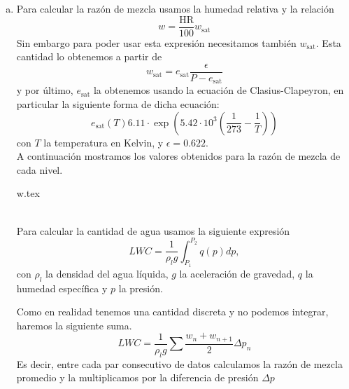 \documentclass[../main.tex]{subfiles}
\begin{document}
\begin{enumerate}[a)]
    \item Para calcular la razón de mezcla usamos la humedad relativa y la relación
        \begin{equation}
            w = \frac{\text{HR}}{100} w_\text{sat}  
        \end{equation}
Sin embargo para poder usar esta expresión necesitamos también $w_\text{sat}$. Esta cantidad lo obtenemos a partir de
\begin{equation}
    w_\text{sat} = e_\text{sat} \frac{\epsilon}{P - e_\text{sat}}
\end{equation}
y por último, $e_\text{sat}$ la obtenemos usando la ecuación de Clasius-Clapeyron, en particular la siguiente forma de dicha ecuación:
\begin{equation}
   e_\text{sat}(T) 6.11 \cdot \exp \left(   5.42\cdot 10^3 \left( \frac{1}{273} - \frac{1}{T} \right) \right)
\end{equation}
con $T$ la temperatura en Kelvin, y $\epsilon = 0.622$.\\

A continuación mostramos los valores obtenidos para la razón de mezcla de cada nivel.\\

\begin{minipage}{\linewidth}
\centering
{}
{w.tex}
\end{minipage}\\

Para calcular la cantidad de agua usamos la siguiente expresión
\begin{equation}
    LWC = \frac{1}{\rho_l g} \int_{P_1}^{P_2} q(p) dp
,\end{equation}
con $\rho_l$ la densidad del agua líquida, $g$ la aceleración de gravedad, $q$ la humedad específica y $p$ la presión. 

Como en realidad tenemos una cantidad discreta y no podemos integrar, haremos la siguiente suma. 
 \begin{equation}
     LWC = \frac{1}{\rho_l g} \sum \frac{w_n + w_{n+1}}{2}\Delta p_n
\end{equation}
Es decir, entre cada par consecutivo de datos calculamos la razón de mezcla promedio y la multiplicamos por la diferencia de presión $\Delta p$


\end{enumerate}
\end{document}
